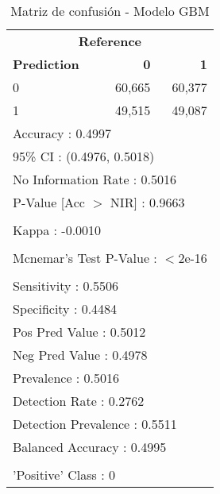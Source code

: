 \begin{table}[htbp]
\centering
\caption{Matriz de confusión - Modelo GBM}
\label{tab:confusion-gbm}
\begin{tabular}{lrr}
\toprule
\multicolumn{3}{c}{\textbf{Reference}} \\
\textbf{Prediction} & \textbf{0} & \textbf{1} \\
\midrule
0 & 60,665 & 60,377 \\
1 & 49,515 & 49,087 \\
\midrule
\multicolumn{3}{l}{Accuracy : 0.4997} \\
\multicolumn{3}{l}{95\% CI : (0.4976, 0.5018)} \\
\multicolumn{3}{l}{No Information Rate : 0.5016} \\
\multicolumn{3}{l}{P-Value [Acc $>$ NIR] : 0.9663} \\
\\
\multicolumn{3}{l}{Kappa : -0.0010} \\
\\
\multicolumn{3}{l}{Mcnemar's Test P-Value : $<$2e-16} \\
\\
\multicolumn{3}{l}{Sensitivity : 0.5506} \\
\multicolumn{3}{l}{Specificity : 0.4484} \\
\multicolumn{3}{l}{Pos Pred Value : 0.5012} \\
\multicolumn{3}{l}{Neg Pred Value : 0.4978} \\
\multicolumn{3}{l}{Prevalence : 0.5016} \\
\multicolumn{3}{l}{Detection Rate : 0.2762} \\
\multicolumn{3}{l}{Detection Prevalence : 0.5511} \\
\multicolumn{3}{l}{Balanced Accuracy : 0.4995} \\
\\
\multicolumn{3}{l}{'Positive' Class : 0} \\
\bottomrule
\end{tabular}
\end{table}